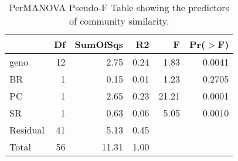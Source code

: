 \begin{table}[ht]
\centering
\begin{tabular}{lrrrrr}
  \hline
 & Df & SumOfSqs & R2 & F & Pr($>$F) \\ 
  \hline
geno & 12 & 2.75 & 0.24 & 1.83 & 0.0041 \\ 
  BR & 1 & 0.15 & 0.01 & 1.23 & 0.2705 \\ 
  PC & 1 & 2.65 & 0.23 & 21.21 & 0.0001 \\ 
  SR & 1 & 0.63 & 0.06 & 5.05 & 0.0010 \\ 
  Residual & 41 & 5.13 & 0.45 &  &  \\ 
  Total & 56 & 11.31 & 1.00 &  &  \\ 
   \hline
\end{tabular}
\caption{PerMANOVA Pseudo-F Table showing the predictors of community similarity.} 
\label{tab:rcom_perm}
\end{table}
